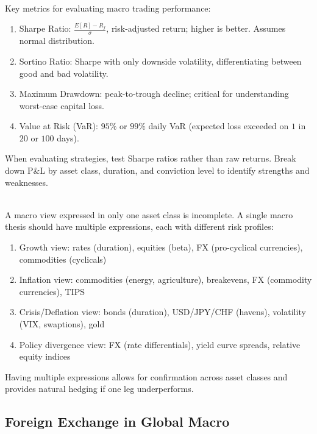 \begin{remark} \\
Key metrics for evaluating macro trading performance:
\begin{enumerate}[label=\roman*.]
\setlength{\itemsep}{0pt}
\item Sharpe Ratio: $\frac{E[R] - R_f}{\sigma}$, risk-adjusted return; higher is better. Assumes normal distribution.
\item Sortino Ratio: Sharpe with only downside volatility, differentiating between good and bad volatility.
\item Maximum Drawdown: peak-to-trough decline; critical for understanding worst-case capital loss.
\item Value at Risk (VaR): $95\%$ or $99\%$ daily VaR (expected loss exceeded on $1$ in $20$ or $100$ days).
\end{enumerate}
When evaluating strategies, test Sharpe ratios rather than raw returns. Break down P\&L by asset class, duration, and conviction level to identify strengths and weaknesses.
\end{remark}

\begin{remark} \\
A macro view expressed in only one asset class is incomplete. A single macro thesis should have multiple expressions, each with different risk profiles:
\begin{enumerate}[label=\roman*.]
\setlength{\itemsep}{0pt}
\item Growth view: rates (duration), equities (beta), FX (pro-cyclical currencies), commodities (cyclicals)
\item Inflation view: commodities (energy, agriculture), breakevens, FX (commodity currencies), TIPS
\item Crisis/Deflation view: bonds (duration), USD/JPY/CHF (havens), volatility (VIX, swaptions), gold
\item Policy divergence view: FX (rate differentials), yield curve spreads, relative equity indices
\end{enumerate}
Having multiple expressions allows for confirmation across asset classes and provides natural hedging if one leg underperforms.
\end{remark}

\subsection{Foreign Exchange in Global Macro}

